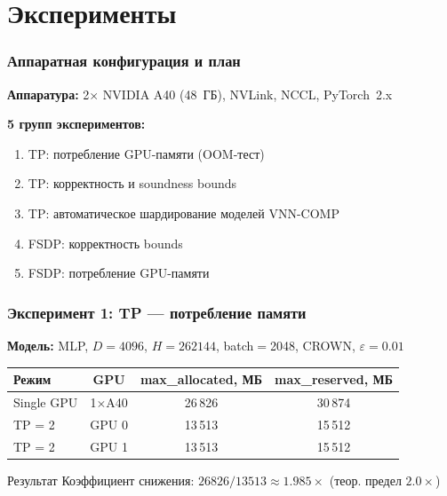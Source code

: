 
\section{Эксперименты}

\begin{frame}
\frametitle{Аппаратная конфигурация и план}

\textbf{Аппаратура:} 2$\times$ NVIDIA A40 (48~ГБ), NVLink, NCCL, PyTorch~2.x

\vspace{0.3cm}

\textbf{5 групп экспериментов:}
\begin{enumerate}
    \item TP: потребление GPU-памяти (OOM-тест)
    \item TP: корректность и soundness bounds
    \item TP: автоматическое шардирование моделей VNN-COMP
    \item FSDP: корректность bounds
    \item FSDP: потребление GPU-памяти
\end{enumerate}

\end{frame}

\begin{frame}
\frametitle{Эксперимент 1: TP --- потребление памяти}

\textbf{Модель:} MLP, $D{=}4096$, $H{=}262144$, batch$=$2048, CROWN, $\varepsilon{=}0.01$

\vspace{0.3cm}

\begin{table}[h]
\centering
\scriptsize
\begin{tabular}{lccc}
\hline
\textbf{Режим} & \textbf{GPU} & \textbf{max\_allocated, МБ} & \textbf{max\_reserved, МБ} \\
\hline
Single GPU & 1$\times$A40 & 26\,826 & 30\,874 \\
TP = 2     & GPU 0        & 13\,513 & 15\,512 \\
TP = 2     & GPU 1        & 13\,513 & 15\,512 \\
\hline
\end{tabular}
\end{table}

\vspace{0.3cm}

\begin{exampleblock}{Результат}
Коэффициент снижения: $26826 / 13513 \approx \mathbf{1.985\times}$ (теор. предел $2.0\times$)
\end{exampleblock}

\end{frame}

